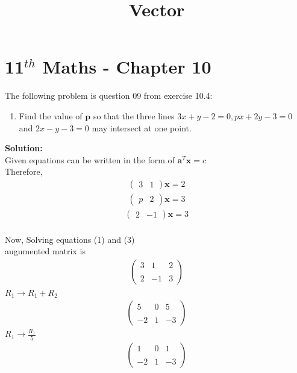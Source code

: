 \documentclass[12pt]{article}
\newcommand{\solution}{\noindent \textbf{Solution: }}
\newcommand{\myvec}[1]{\ensuremath{\begin{pmatrix}#1\end{pmatrix}}}
\let\vec\mathbf
\begin{document}
\graphicspath{{./Documents}{./figs}}
\begin{center}
	\title{\textbf{Vector}}
	\date{\vspace{-5ex}}
	\maketitle
\end{center}
\setcounter{page}{1}
\section*{11$ ^{th} $ Maths - Chapter 10}
The following problem is question 09 from exercise 10.4:
\begin{enumerate}
	\item Find the value of $\vec{p}$ so that the three lines $ 3x + y - 2 = 0, px + 2y - 3 = 0 $ and $ 2x - y - 3 = 0 $ may intersect at one point.
\end{enumerate}
\solution \\
Given equations can be written in the form of $ \vec{a}^{T}\vec{x} = c$ \\
Therefore, \\ 
\begin{align}
	\myvec{3&1}\vec{x}=2
\end{align}
\begin{align}
	\myvec{p&2}\vec{x}=3
\end{align}
\begin{align}
	\myvec{2&-1}\vec{x}=3
\end{align}\\
Now, Solving equations (1) and (3)\\augumented matrix is
\begin{align}
	\begin{pmatrix}
		3 & 1 & 2 \\ \\
		2 & -1 & 3
	\end{pmatrix}
\end{align}
$ R_1 \rightarrow R_1 + R_2 $
\begin{align}
	\begin{pmatrix}
		5 & 0 & 5 \\ \\
		-2 & 1 & -3
	\end{pmatrix}
\end{align}
$ R_1 \rightarrow \frac{R_1}{5} $
\begin{align}
	\begin{pmatrix}
		1 & 0 & 1 \\ \\
		-2 & 1 & -3
	\end{pmatrix}
\end{align}
\end{document}
